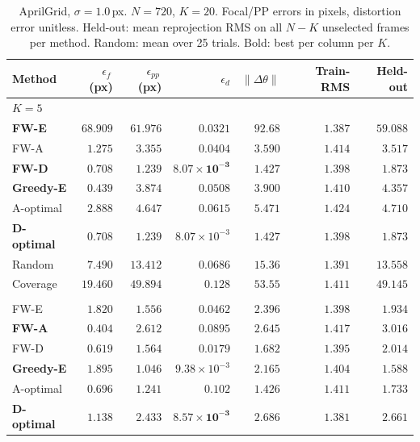 \documentclass[letterpaper, 9
 pt, conference]{ieeeconf}
\begin{document}
\begin{table}[ht]
\centering
\setlength{\tabcolsep}{4pt}
\caption{AprilGrid, $\sigma{=}1.0$\,px. $N{=}720$, $K{=}20$. Focal/PP errors in pixels, distortion error unitless. Held-out: mean reprojection RMS on all $N{-}K$ unselected frames per method. Random: mean over 25 trials. Bold: best per column per $K$.}
\label{tab:ksweep_aprilgrid_sigma10}
\scriptsize
\renewcommand{\arraystretch}{0.80}
\begin{tabular}{lrrrrrr}
\toprule
Method & $\epsilon_f$\,(px) & $\epsilon_{pp}$\,(px) & $\epsilon_d$ & $\|\Delta\theta\|$ & Train-RMS & Held-out \\
\midrule
\multicolumn{7}{l}{\textit{$K{=}5$}} \\[1pt]
\textbf{FW-E} & $68.909$ & $61.976$ & $0.0321$ & $92.68$ & $\mathbf{1.387}$ & $59.088$ \\
FW-A & $1.275$ & $3.355$ & $0.0404$ & $3.590$ & $1.414$ & $3.517$ \\
\textbf{FW-D} & $0.708$ & $\mathbf{1.239}$ & $\mathbf{8.07\!\times\!10^{-3}}$ & $\mathbf{1.427}$ & $1.398$ & $\mathbf{1.873}$ \\
\textbf{Greedy-E} & $\mathbf{0.439}$ & $3.874$ & $0.0508$ & $3.900$ & $1.410$ & $4.357$ \\
A-optimal & $2.888$ & $4.647$ & $0.0615$ & $5.471$ & $1.424$ & $4.710$ \\
\textbf{D-optimal} & $0.708$ & $\mathbf{1.239}$ & $8.07\!\times\!10^{-3}$ & $\mathbf{1.427}$ & $1.398$ & $\mathbf{1.873}$ \\
Random & $7.490$ & $13.412$ & $0.0686$ & $15.36$ & $1.391$ & $13.558$ \\
Coverage & $19.460$ & $49.894$ & $0.128$ & $53.55$ & $1.411$ & $49.145$ \\
\addlinespace[1pt]
\multicolumn{7}{l}{\textit{$K{=}10$}} \\[1pt]
FW-E & $1.820$ & $1.556$ & $0.0462$ & $2.396$ & $1.398$ & $1.934$ \\
\textbf{FW-A} & $\mathbf{0.404}$ & $2.612$ & $0.0895$ & $2.645$ & $1.417$ & $3.016$ \\
FW-D & $0.619$ & $1.564$ & $0.0179$ & $1.682$ & $1.395$ & $2.014$ \\
\textbf{Greedy-E} & $1.895$ & $\mathbf{1.046}$ & $9.38\!\times\!10^{-3}$ & $2.165$ & $1.404$ & $\mathbf{1.588}$ \\
A-optimal & $0.696$ & $1.241$ & $0.102$ & $\mathbf{1.426}$ & $1.411$ & $1.733$ \\
\textbf{D-optimal} & $1.138$ & $2.433$ & $\mathbf{8.57\!\times\!10^{-3}}$ & $2.686$ & $\mathbf{1.381}$ & $2.661$ \\

\end{tabular}
\end{table}
\end{document}
